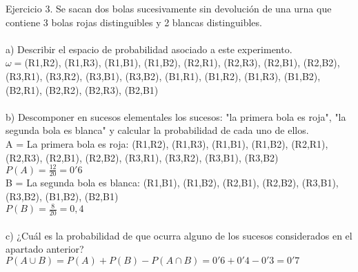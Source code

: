 Ejercicio 3. Se sacan dos bolas sucesivamente sin devolución de una urna que contiene 3 bolas rojas distinguibles y 2 blancas distinguibles. \\ \\
a) Describir el espacio de probabilidad asociado a este experimento. \\
$\omega = ${(R1,R2), (R1,R3), (R1,B1), (R1,B2), (R2,R1), (R2,R3), (R2,B1), (R2,B2), (R3,R1), (R3,R2), (R3,B1), (R3,B2), (B1,R1), (B1,R2), (B1,R3), (B1,B2), (B2,R1), (B2,R2), (B2,R3), (B2,B1)} \\ \\
b) Descomponer en sucesos elementales los sucesos: "la primera bola es roja", "la segunda bola es blanca" y calcular la probabilidad de cada uno de ellos. \\
A = La primera bola es roja: {(R1,R2), (R1,R3), (R1,B1), (R1,B2), (R2,R1), (R2,R3), (R2,B1), (R2,B2), (R3,R1), (R3,R2), (R3,B1), (R3,B2)} \\
$P(A) = \frac{12}{20} = 0'6$ \\
B = La segunda bola es blanca: {(R1,B1), (R1,B2), (R2,B1), (R2,B2), (R3,B1), (R3,B2), (B1,B2), (B2,B1)} \\
$P(B) = \frac{8}{20} = 0,4$ \\ \\
c) ¿Cuál es la probabilidad de que ocurra alguno de los sucesos considerados en el apartado anterior? \\
$P(A\cup B) = P(A)+P(B)-P(A\cap B) = 0'6 + 0'4 - 0'3 = 0'7$ \\ \\
